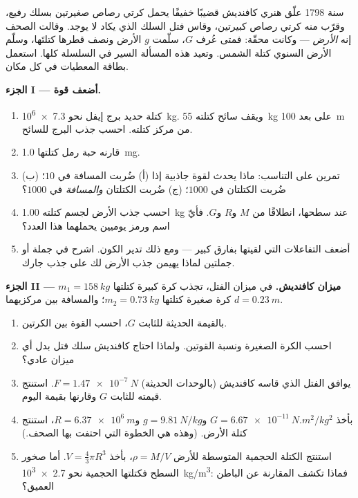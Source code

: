 \begin{problem}
\label{pb:g10:universal-gravitation:1}
سنة 1798 علّق هنري كافنديش قضيبًا خفيفًا يحمل كرتي رصاص
صغيرتين بسلك رفيع، وقرّب منه كرتي رصاص كبيرتين،
وقاس فتل السلك الذي يكاد لا يوجد. وقالت الصحف
إنه \emph{ الأرض} --- وكانت محقّة: فمتى عُرف $G$،
سلّمت $g$ الأرض ونصف قطرها كتلتَها، وسلّم
 الأرض السنوي كتلة الشمس. وتعيد هذه المسألة السير في
السلسلة كلها. استعمل بطاقة المعطيات في كل مكان.

\medskip
\noindent\textbf{الجزء I --- أضعف قوة.}
\begin{enumerate}
  \item كتلة حديد برج إيفل نحو \qty{7.3e6}{kg}. ويقف
        سائح كتلته \qty{55}{kg} على بعد \qty{100}{m} من مركز
        كتلته. احسب جذب البرج للسائح.
  \item قارنه  حبة رمل كتلتها \qty{1.0}{mg}.
  \item تمرين على التناسب: ماذا يحدث لقوة جاذبية
        إذا (أ) ضُربت المسافة في $10$؛ (ب) ضُربت الكتلتان
        في $1000$؛ (ج) ضُربت الكتلتان \emph{والمسافة}
        في $1000$؟
  \item احسب جذب الأرض لجسم كتلته \qty{1.00}{kg} عند
        سطحها، انطلاقًا من $M$ و$R$ و$G$. فأيّ اسم ورمز يوميين
        يحملهما هذا العدد؟
  \item {} أضعف التفاعلات التي لقيتها بفارق كبير ---
        ومع ذلك تدير الكون. اشرح في جملة أو جملتين
        لماذا يهيمن جذب الأرض لك على جذب جارك.
\end{enumerate}

\medskip
\noindent\textbf{الجزء II --- ميزان كافنديش.}
في ميزان الفتل، تجذب كرة كبيرة كتلتها $m_1 = \qty{158}{kg}$
كرة صغيرة كتلتها $m_2 = \qty{0.73}{kg}$؛ والمسافة بين مركزيهما
$d = \qty{0.23}{m}$.
\begin{enumerate}[resume]
  \item بالقيمة الحديثة للثابت $G$، احسب القوة بين
        الكرتين.
  \item احسب  الكرة الصغيرة ونسبة القوتين.
        ولماذا احتاج كافنديش سلك فتل بدل أي
        ميزان عادي؟
  \item يوافق الفتل الذي قاسه كافنديش (بالوحدات الحديثة)
        $F = \qty{1.47e-7}{N}$. استنتج قيمته للثابت $G$ وقارنها
        بقيمة اليوم.
  \item بأخذ $G = \qty{6.67e-11}{N.m^2/kg^2}$ و$g = \qty{9.81}{N/kg}$
        و$R = \qty{6.37e6}{m}$، استنتج كتلة الأرض. (وهذه
        هي الخطوة التي احتفت بها الصحف.)
  \item استنتج الكتلة الحجمية المتوسطة للأرض $\rho = M / V$، بأخذ
        $V = \frac43 \pi R^3$. أما صخور السطح فكتلتها الحجمية نحو
        \qty{2.7e3}{kg/m^3}: فماذا تكشف المقارنة عن
        الباطن العميق؟
\end{enumerate}


\end{problem}
